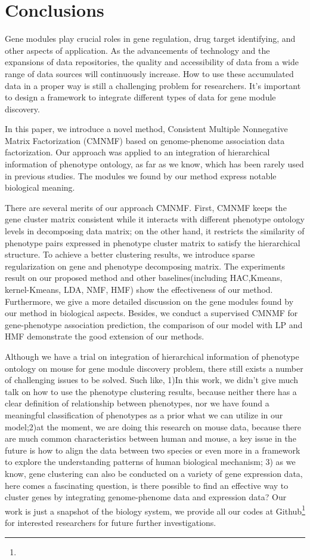 \documentclass{bmcart}
\begin{document}
\section*{Conclusions}
Gene modules play crucial roles in gene regulation, drug target identifying, and other aspects of application. As the advancements of technology and the expansions of data repositories, the quality and accessibility of data from a wide range of data sources will continuously increase. How to use these accumulated data in a proper way is still a challenging problem for researchers. It's important to design a framework to integrate different types of data for gene module discovery.

In this paper, we introduce a novel method, Consistent Multiple Nonnegative Matrix Factorization (CMNMF) based on genome-phenome association data factorization. Our approach was applied to an integration of hierarchical information of phenotype ontology, as far as we know, which has been rarely used in previous studies. The modules we found by our method express notable biological meaning.

There are several merits of our approach CMNMF. First, CMNMF keeps the gene cluster matrix consistent while it interacts with different phenotype ontology levels in decomposing data matrix; on the other hand, it restricts the similarity of phenotype pairs expressed in phenotype cluster matrix to satisfy the hierarchical structure. To achieve a better clustering results, we introduce sparse regularization on gene and phenotype decomposing matrix. The experiments result on our proposed method and other baselines(including HAC,Kmeans, kernel-Kmeans, LDA, NMF, HMF) show the effectiveness of our method. Furthermore, we give a more detailed discussion on the gene modules found by our method in biological aspects. Besides, we conduct a supervised CMNMF for gene-phenotype association prediction, the comparison of our model with LP and HMF demonstrate the good extension of our methods.

Although we have a trial on integration of hierarchical information of phenotype ontology on mouse for gene module discovery problem, there still exists a number of challenging issues to be solved. Such like, 1)In this work, we didn't give much talk on how to use the phenotype clustering results, because neither there has a clear definition of relationship between phenotypes, nor we have found a meaningful classification of phenotypes as a prior what we can utilize in our model;2)at the moment, we are doing this research on mouse data, because there are much common characteristics between human and mouse, a key issue in the future is how to align the data between two species or even more in a framework to explore the understanding patterns of human biological mechanism; 3) as we know, gene clustering can also be conducted on a variety of gene expression data, here comes a fascinating question, is there possible to find an effective way to cluster genes by integrating genome-phenome data and expression data? Our work is just a snapshot of the biology system, we provide all our codes at Github\footnote{} for interested researchers for future further investigations.
\end{document}
